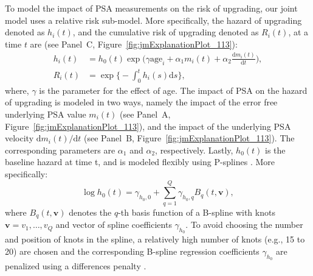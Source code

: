 To model the impact of PSA measurements on the risk of upgrading, our joint model uses a relative risk sub-model. More specifically, the hazard of upgrading denoted as $h_i(t)$, and the cumulative risk of upgrading denoted as $R_i(t)$, at a time $t$ are (see Panel~C, Figure~\ref{fig:jmExplanationPlot_113}):
\begin{equation}
\label{eq:rel_risk_model}
\begin{split}
    h_i(t) &= h_0(t) \exp\Big(\gamma \mbox{age}_i +\alpha_{1} m_{i}(t) + \alpha_{2} \frac{\mathrm{d}m_{i}(t)}{\mathrm{d}{t}}\Big),\\
    R_i(t) &= \exp\Big\{-\int_0^{t} h_i(s)\mathrm{d}{s}\Big\},
    \end{split}
\end{equation}
where, $\gamma$ is the parameter for the effect of age. The impact of PSA on the hazard of upgrading is modeled in two ways, namely the impact of the error free underlying PSA value $m_{i}(t)$ (see Panel~A, Figure~\ref{fig:jmExplanationPlot_113}), and the impact of the underlying PSA velocity $\mathrm{d}m_{i}(t)/\mathrm{d}{t}$ (see Panel~B, Figure~\ref{fig:jmExplanationPlot_113}). The corresponding parameters are $\alpha_{1}$ and $\alpha_{2}$, respectively. Lastly, $h_0(t)$ is the baseline hazard at time t, and is modeled flexibly using P-splines \citep{eilers1996flexible}. More specifically:
\begin{equation*}
\log{h_0(t)} = \gamma_{h_0,0} + \sum_{q=1}^Q \gamma_{h_0,q} B_q(t, \boldsymbol{v}),
\end{equation*}
where $B_q(t, \boldsymbol{v})$ denotes the $q$-th basis function of a B-spline with knots $\boldsymbol{v} = v_1, \ldots, v_Q$ and vector of spline coefficients $\gamma_{h_0}$. To avoid choosing the number and position of knots in the spline, a relatively high number of knots (e.g., 15 to 20) are chosen and the corresponding B-spline regression coefficients $\gamma_{h_0}$ are penalized using a differences penalty \citep{eilers1996flexible}.


